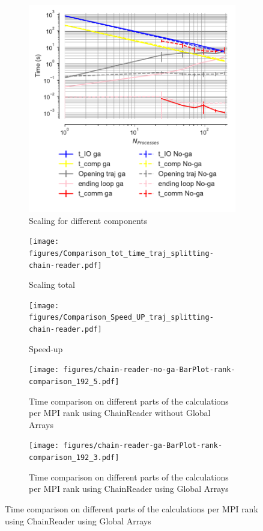  \begin{figure}[!htb]
\centering
\begin{subfigure}{.3\textwidth}
  \includegraphics[width=\linewidth]{figures/Comparison_IO_compute_scaling_traj_splitting-chain-reader.pdf}
  \captionsetup{format=hang}
  \caption{Scaling for different components}
  \label{fig:MPIscaling-chain-reader}
\end{subfigure}
\hfill
\begin{subfigure}{.3\textwidth}
  \texttt{[image: figures/Comparison\_tot\_time\_traj\_splitting-chain-reader.pdf]}
  \caption{Scaling total}
  \label{fig:MPItottime-chain-reader}
\end{subfigure}
\hfill
\begin{subfigure}{.3\textwidth}
  \texttt{[image: figures/Comparison\_Speed\_UP\_traj\_splitting-chain-reader.pdf]}
  \caption{Speed-up}
  \label{fig:MPIspeedup-chain-reader}
\end{subfigure}
\bigskip

\begin{subfigure} {.45\textwidth}
  \texttt{[image: figures/chain-reader-no-ga-BarPlot-rank-comparison\_192\_5.pdf]}
  \captionsetup{format=hang}
   \caption{Time comparison on different parts of the calculations per MPI rank using ChainReader without Global Arrays}
  \label{fig:MPIranks-split-chain-reader}
\end{subfigure}
\hfill
\begin{subfigure} {.45\textwidth}
  \texttt{[image: figures/chain-reader-ga-BarPlot-rank-comparison\_192\_3.pdf]}
  \captionsetup{format=hang}
  \caption{Time comparison on different parts of the calculations per MPI rank using ChainReader using Global Arrays}
  \label{fig:MPIranks-split-ga-chain-reader}
\end{subfigure}


\end{figure}
